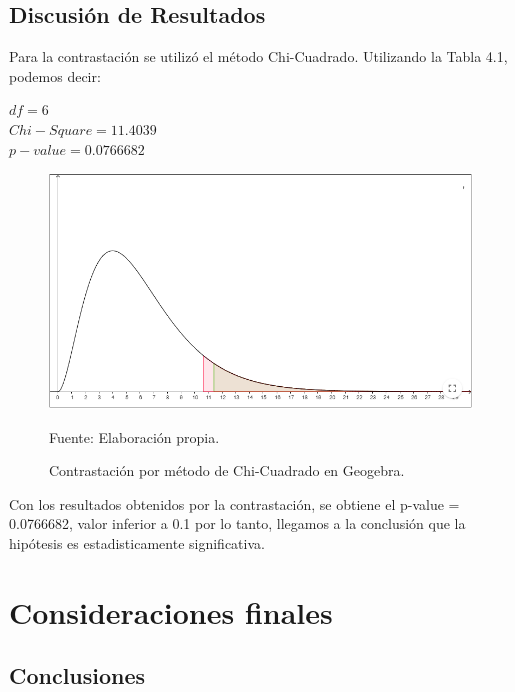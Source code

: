 \section{Discusión de Resultados}

Para la contrastación se utilizó el método Chi-Cuadrado. Utilizando la Tabla 4.1, podemos decir:\\

\begin{center}
$df = 6$\\
$Chi-Square = 11.4039$\\
$p-value = 0.0766682$\\
\end{center}

\begin{figure}[H]
	\centering
		\includegraphics[scale=0.7]{imagenes/chicuadrado.png}
		\caption{Contrastación por método de Chi-Cuadrado en Geogebra.}
	\begin{center}
    Fuente: Elaboración propia.
    \end{center}
	\label{fig:39}
\end{figure}

Con los resultados obtenidos por la contrastación, se obtiene el p-value = 0.0766682, valor inferior a 0.1 por lo tanto, llegamos a la conclusión que la hipótesis es estadisticamente significativa.


\newpage

\chapter{Consideraciones finales}


\section{Conclusiones}

